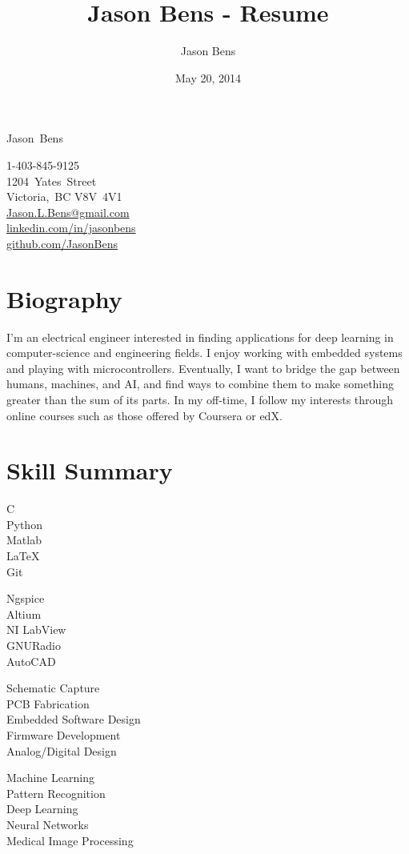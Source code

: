 \documentclass[a4paper, 10pt]{article}
\title{Jason Bens - Resume}
\author{Jason Bens}
\date{May 20, 2014}
\makeatletter
\newcommand {\firstname} {Jason}
\newcommand {\lastname} {Bens}
\newcommand {\address} {
  \mbox{1204 Yates Street}\\
  \mbox{Victoria, BC}
  \mbox{V8V 4V1}
}
\newcommand {\phone} {\mbox{1-403-845-9125}}
\newcommand {\email} {\url{Jason.L.Bens@gmail.com}}
\newcommand {\linkedin} {\url{linkedin.com/in/jasonbens}}
\newcommand {\github} {\url{github.com/JasonBens}}
\makeatother
\begin{document}
\begin{minipage}[t]{0.7\textwidth}
  \begin{center}
    {\Huge \firstname~\lastname}
  \end{center}
\end{minipage}\hfill
\begin{minipage}{0.3\textwidth}
  \begin{flushright}
    \phone \\
    \address \\
    \email \\
    \linkedin \\
    \github \\
  \end{flushright}
\end{minipage}

\hrulefill

\section{Biography}
I'm an electrical engineer interested in finding applications for deep learning in computer-science and engineering fields. I enjoy working with embedded systems and playing with microcontrollers. Eventually, I want to bridge the gap between humans, machines, and AI, and find ways to combine them to make something greater than the sum of its parts. In my off-time, I follow my interests through online courses such as those offered by Coursera or edX.

\section{Skill Summary} 
  \parbox{0.1\textwidth}{
    C\\
    Python\\
    Matlab\\
    \LaTeX\\
    Git
  } \hfill
  \parbox{0.13\textwidth}{
    Ngspice\\
    Altium\\
    NI LabView\\
    GNURadio\\
    AutoCAD
  } \hfill
  \parbox{0.25\textwidth}{
    Schematic Capture\\
    PCB Fabrication\\
    Embedded Software Design\\
    Firmware Development\\
    Analog/Digital Design
  } \hfill
  \parbox{0.25\textwidth}{
    Machine Learning\\
    Pattern Recognition\\
    Deep Learning\\
    Neural Networks\\
    Medical Image Processing
  } \hfill
  
\end{document}
